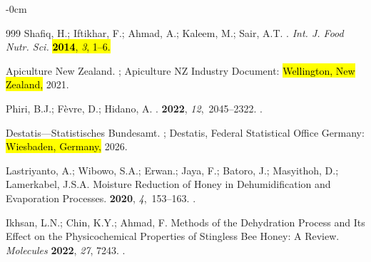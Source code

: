 \documentclass[foods,review,accept,pdftex,moreauthors]{Definitions/mdpi}
\begin{document}
{\begin{adjustwidth}{-\extralength}{0cm}
\begin{thebibliography}{999}
Shafiq, H.; Iftikhar, F.; Ahmad, A.; Kaleem, M.; Sair, A.T.
.
\newblock \emph{Int. J. Food Nutr. Sci.}  \hl{\textbf{2014}, \emph{3}, 1--6.} 


{Apiculture New Zealand}.
;
\newblock Apiculture NZ Industry Document: \hl{Wellington, New Zealand,} 
  2021.

Phiri, B.J.; Fèvre, D.; Hidano, A.
.
 {\bf 2022}, {\em 12},~2045--2322.
.

{Destatis---Statistisches Bundesamt}.
; 
\newblock Destatis, Federal Statistical Office Germany: \hl{Wiesbaden,  Germany,} 
 2026.

Lastriyanto, A.; Wibowo, S.A.; Erwan.; Jaya, F.; Batoro, J.; Masyithoh, D.;
  Lamerkabel, J.S.A.
\newblock Moisture Reduction of Honey in Dehumidification and Evaporation
  Processes.
 {\bf
  2020}, {\em 4},~153--163.
.

Ikhsan, L.N.; Chin, K.Y.; Ahmad, F.
\newblock Methods of the Dehydration Process and Its Effect on the
  Physicochemical Properties of Stingless Bee Honey: {A} Review. \emph{Molecules}   \textbf{2022}, \emph{27}, 7243.
.


\end{thebibliography}
\end{adjustwidth}}
\end{document}
